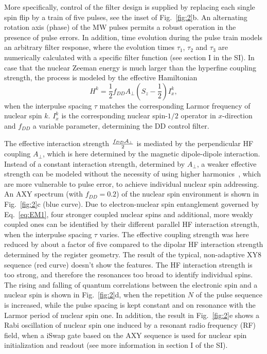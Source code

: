\documentclass[aps,prl,floatfix,twocolumn,footinbib,superscriptaddress]{revtex4-1}
\begin{document}
More specifically, control of the filter design is supplied by replacing each single spin flip by a train of five pulses, see the inset of Fig.~\ref{fig:2}b. An alternating rotation axis (phase) of the MW pulses permits a robust operation in the presence of pulse errors. In addition, time evolution during the pulse train models an arbitrary filter response, where the evolution times $\tau_1$, $\tau_2$ and $\tau_3$ are numerically calculated with a specific filter function (see section \RN{1} in the SI). In case that the nuclear Zeeman energy is much larger than the hyperfine coupling strength, the process is modeled by the effective Hamiltonian~\cite{Cas2015}
\begin{equation}
H^k = \frac{1}{2}f_{DD}A_\perp \left(S_z -\frac{1}{2}\right) I^k_x,
\label{eq:EM1}
\end{equation}
when the interpulse spacing $\tau$ matches the corresponding Larmor frequency of nuclear spin $k$. $I_x^k$ is the corresponding nuclear spin-$1/2$ operator in $x$-direction and $f_{DD}$ a variable parameter, determining the DD control filter. 

The effective interaction strength $\frac{f_{DD}\mathcal{A}_\perp}{2}$ is mediated by the perpendicular HF coupling $A_\perp$, which is here determined by the magnetic dipole-dipole interaction. Instead of a constant interaction strength, determined by $A_\perp$, a weaker effective strength can be modeled without the necessity of using higher harmonics~\cite{Childress281,Tam14}, which are more vulnerable to pulse error, to achieve individual nuclear spin addressing. An AXY spectrum (with $f_{DD}=0.2$) of the nuclear spin environment is shown in Fig.~\ref{fig:2}c (blue curve). Due to electron-nuclear spin entanglement governed by Eq.~\eqref{eq:EM1}, four stronger coupled nuclear spins and additional, more weakly coupled ones can be identified by their different parallel HF interaction strength, when the interpulse spacing $\tau$ varies. The effective coupling strength was here reduced by about a factor of five compared to the dipolar HF interaction strength determined by the register geometry. The result of the typical, non-adaptive XY8 sequence (red curve) doesn't show the features. The HF interaction strength is too strong, and therefore the resonances too broad to identify individual spins. The rising and falling of quantum correlations between the electronic spin and a nuclear spin is shown in Fig.~\ref{fig:2}d, when the repetition $N$ of the pulse sequence is increased, while the pulse spacing is kept constant and on resonance with the Larmor period of nuclear spin one. In addition, the result in Fig.~\ref{fig:2}e shows a Rabi oscillation of nuclear spin one induced by a resonant radio frequency (RF) field, when a iSwap gate \cite{Cas17} based on the AXY sequence is used for nuclear spin initialization and readout (see more information in section \RN{1} of the SI). 
\end{document}
